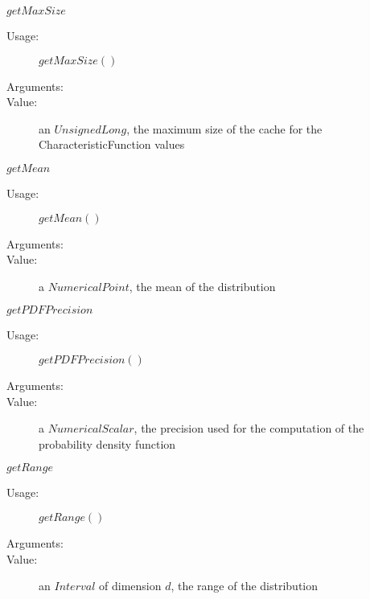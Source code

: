 \begin{description}
\begin{description}
  \item $getMaxSize$
    \begin{description}
    \item[Usage:]  $getMaxSize()$
    \item[Arguments:]  \strut
    \item[Value:] an $UnsignedLong$, the maximum size of the cache for the CharacteristicFunction values
    \end{description}

  \item $getMean$
    \begin{description}
    \item[Usage:]  $getMean()$
    \item[Arguments:]  \strut
    \item[Value:] a $NumericalPoint$, the mean of the distribution
    \end{description}

  \item $getPDFPrecision$
    \begin{description}
    \item[Usage:]  $getPDFPrecision()$
    \item[Arguments:]  \strut
    \item[Value:] a $NumericalScalar$, the precision used for the computation of the probability density function
    \end{description}

  \item $getRange$
    \begin{description}
    \item[Usage:]  $getRange()$
    \item[Arguments:]  \strut
    \item[Value:] an $Interval$ of dimension $d$, the range of the distribution
    \end{description}


\end{description}
\end{description}
